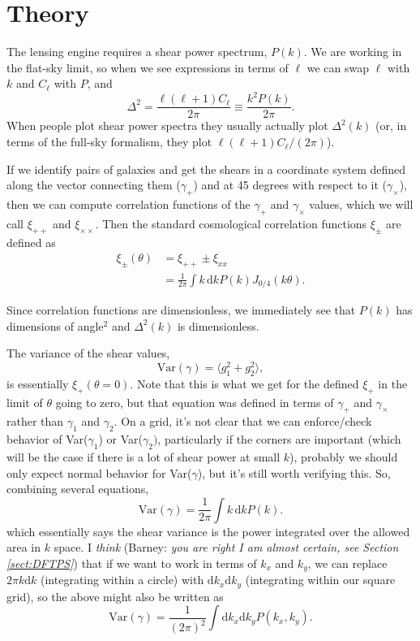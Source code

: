 \documentclass[preprint]{aastex}
\newcommand{\rmd}{\ensuremath{\mathrm{d}}}
\newcommand{\beq}{\begin{equation}}
\newcommand{\eeq}{\end{equation}}
\begin{document}
\section{Theory}

The lensing engine requires a shear power spectrum, $P(k)$.  We are
working in the flat-sky limit, so when we see expressions in terms of
$\ell$ we can swap $\ell$ with $k$ and $C_\ell$ with $P$, and
\beq
\Delta^2 = \frac{\ell(\ell+1) C_{\ell}}{2\pi}\equiv \frac{k^2 P(k)}{2\pi}.
\eeq
When people plot shear power spectra they usually actually plot
$\Delta^2(k)$ (or, in terms of the full-sky formalism, they plot $\ell(\ell+1)C_\ell/(2\pi)$).

If we identify pairs of galaxies and get the shears in a coordinate
system defined along the vector connecting them ($\gamma_+$) and at 45
degrees with respect to it ($\gamma_\times$), then we can compute
correlation functions of the $\gamma_+$ and $\gamma_\times$ values,
which we will call $\xi_{++}$ and $\xi_{\times\times}$.  Then the
standard cosmological correlation functions $\xi_{\pm}$ are defined as
\begin{align}
\xi_{\pm}(\theta) &=  \xi_{++}\pm \xi_{xx} \\
 &= \frac{1}{2\pi}\int k\,\rmd k P(k) J_{0/4}(k\theta).  \label{eq:xi}
\end{align}

Since correlation functions are dimensionless, we immediately see that
$P(k)$ has dimensions of angle$^2$ and $\Delta^2(k)$ is dimensionless.

The variance of the shear values, 
\beq
\mathrm{Var}(\gamma) = \langle g_1^2 + g_2^2\rangle,
\eeq
is essentially $\xi_+(\theta=0)$.   Note that this is what we get for
the defined $\xi_+$ in the limit of $\theta$ going to zero, but that
equation was defined in terms of $\gamma_+$ and $\gamma_\times$ rather
than $\gamma_1$ and $\gamma_2$.  On a grid, it's not clear that we
can enforce/check behavior of Var($\gamma_1$) or Var($\gamma_2)$,
particularly if the corners are important (which will be the case if
there is a lot of shear power at small $k$), probably we should 
 only expect normal behavior for Var($\gamma$), but it's still worth
 verifying this.  So, combining several equations,
\beq\label{E:shearvar}
\mathrm{Var}(\gamma) = \frac{1}{2\pi}\int k\,\rmd k P(k).
\eeq
which essentially says the shear variance is the power integrated over
the allowed area in $k$ space.  I {\em think} (Barney: \emph{you are
  right I am almost certain, see Section \ref{sect:DFTPS}}) that if we want to work
in terms of $k_x$ and $k_y$, we can replace $2\pi k\rmd k$
(integrating within a circle) with $\rmd
k_x \rmd k_y$ (integrating within our square grid), so the above might also be
written as
\beq\label{E:alt-shearvar}
\mathrm{Var}(\gamma) = \frac{1}{(2\pi)^2} \int \rmd k_x \rmd k_y
P(k_x, k_y).
\eeq
\end{document}
